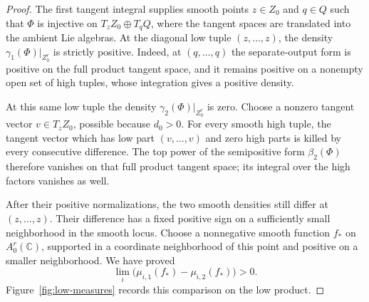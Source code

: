 \begin{proof}
The first tangent integral supplies smooth points \(z\in Z_0\) and
\(q\in Q\) such that \(\Phi\) is injective on
\(T_zZ_0\oplus T_qQ\), where
the tangent spaces are translated into the ambient Lie algebras.
At the diagonal low tuple \((z,\ldots,z)\), the density
\(\gamma_1(\Phi)|_{Z_0^r}\) is strictly positive.  Indeed, at
\((q,\ldots,q)\) the separate-output form is positive on the full
product tangent space, and it remains positive on a nonempty open set
of high tuples, whose integration gives a positive density.

At this same low tuple the density
\(\gamma_2(\Phi)|_{Z_0^r}\) is zero.  Choose a nonzero tangent vector
\(v\in T_zZ_0\), possible because \(d_0>0\).
For every smooth high tuple, the tangent vector which has low part
\((v,\ldots,v)\) and zero high parts is killed by every consecutive
difference.  The top power of the semipositive form
\(\beta_2(\Phi)\) therefore vanishes on that full product tangent
space; its integral over the high factors vanishes as well.

After their positive normalizations, the two smooth densities still
differ at \((z,\ldots,z)\).  Their difference has a fixed positive
sign on a sufficiently small neighborhood in the smooth locus.  Choose
a nonnegative smooth function \(f_*\) on \(A_0^r(\mathbb C)\),
supported in a coordinate neighborhood of this point and positive on a
smaller neighborhood.  We have proved
\begin{equation}\label{eq:low-measure-gap}
 \lim_i\bigl(\mu_{i,1}(f_*)-\mu_{i,2}(f_*)\bigr)>0.
\end{equation}
Figure~\ref{fig:low-measures} records this comparison on the low product.



\end{proof}
